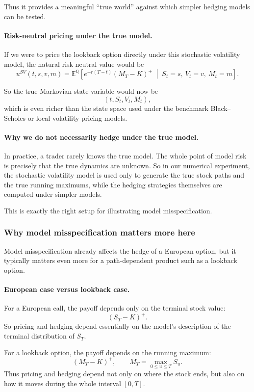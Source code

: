 \documentclass[11pt]{article}
\newcommand{\Qbb}{\mathbb{Q}}
\newcommand{\E}{\mathbb{E}}
\theoremstyle{plain}
\theoremstyle{definition}
\theoremstyle{remark}
\begin{document}
Thus it provides a meaningful ``true world'' against which simpler
hedging models can be tested.

\paragraph{Risk-neutral pricing under the true model.}
If we were to price the lookback option directly under this stochastic
volatility model, the natural risk-neutral value would be
\[
u^{SV}(t,s,v,m)
=
\E^\Qbb\!\left[
e^{-r(T-t)}(M_T-K)^+
\;\middle|\;
S_t=s,\ V_t=v,\ M_t=m
\right].
\]

So the true Markovian state variable would now be
\[
(t,S_t,V_t,M_t),
\]
which is even richer than the state space used under the benchmark
Black--Scholes or local-volatility pricing models.

\paragraph{Why we do not necessarily hedge under the true model.}
In practice, a trader rarely knows the true model.
The whole point of model risk is precisely that the true dynamics are
unknown.
So in our numerical experiment, the stochastic volatility model is used
only to generate the true stock paths and the true running maximums,
while the hedging strategies themselves are computed under simpler
models.

This is exactly the right setup for illustrating model misspecification.

\subsubsection{Why model misspecification matters more here}

Model misspecification already affects the hedge of a European option,
but it typically matters even more for a path-dependent product such as
a lookback option.

\paragraph{European case versus lookback case.}
For a European call, the payoff depends only on the terminal stock
value:
\[
(S_T-K)^+.
\]
So pricing and hedging depend essentially on the model's description of
the terminal distribution of \(S_T\).

For a lookback option, the payoff depends on the running maximum:
\[
(M_T-K)^+,
\qquad
M_T=\max_{0\le u\le T}S_u.
\]
Thus pricing and hedging depend not only on where the stock ends, but
also on how it moves during the whole interval \([0,T]\).
\end{document}
